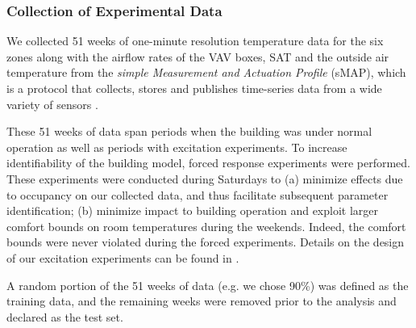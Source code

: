 
\subsubsection{Collection of Experimental Data}\label{sec:building_model_data}

We collected 51 weeks of one-minute resolution temperature data for the six zones along with the airflow rates of the VAV boxes, SAT and the outside air temperature from the \textit{simple Measurement and Actuation Profile} (sMAP), which is a protocol that collects, stores and publishes time-series data from a wide variety of sensors \cite{smap, Dawson-Haggerty:2012aa}. 

These 51 weeks of data span periods when the building was under normal operation as well as periods with excitation experiments. To increase identifiability of the building model, forced response experiments were performed. These experiments were conducted during Saturdays to (a) minimize effects due to occupancy on our collected data, and thus facilitate subsequent parameter identification; (b) minimize impact to building operation and exploit larger comfort bounds on room temperatures during the weekends. Indeed, the comfort bounds were never violated during the forced experiments. Details on the design of our excitation experiments can be found in \cite{Qie}.

A random portion of the 51 weeks of data (e.g. we chose 90\%) was defined as the training data, and the remaining weeks were removed prior to the analysis and declared as the test set.



